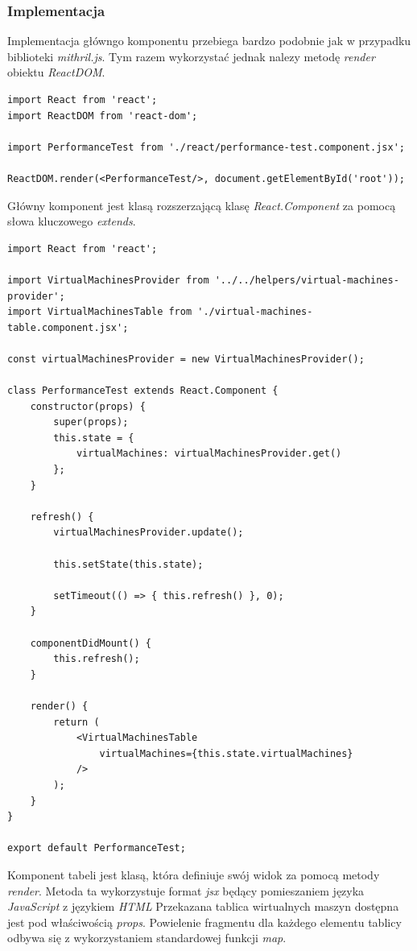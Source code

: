 \documentclass[polish, twoside, 12pt]{mwart}
\begin{document}
\subsubsection{Implementacja}

Implementacja główngo komponentu przebiega bardzo podobnie jak w przypadku biblioteki \emph{mithril.js}. Tym razem wykorzystać jednak nalezy metodę \emph{render} obiektu \emph{ReactDOM}.

\begin{lstlisting}[caption=Inicjalizacja głównego komponentu]
import React from 'react';
import ReactDOM from 'react-dom';

import PerformanceTest from './react/performance-test.component.jsx';

ReactDOM.render(<PerformanceTest/>, document.getElementById('root'));
\end{lstlisting}

Główny komponent jest klasą rozszerzającą klasę \emph{React.Component} za pomocą słowa kluczowego \emph{extends}.

\begin{lstlisting}[caption=Główny komponent]
import React from 'react';

import VirtualMachinesProvider from '../../helpers/virtual-machines-provider';
import VirtualMachinesTable from './virtual-machines-table.component.jsx';

const virtualMachinesProvider = new VirtualMachinesProvider();

class PerformanceTest extends React.Component {
    constructor(props) {
        super(props);
        this.state = {
            virtualMachines: virtualMachinesProvider.get()
        };
    }

    refresh() {
        virtualMachinesProvider.update();

        this.setState(this.state);

        setTimeout(() => { this.refresh() }, 0);
    }

    componentDidMount() {
        this.refresh();
    }

    render() {
        return (
            <VirtualMachinesTable
                virtualMachines={this.state.virtualMachines}
            />
        );
    }
}

export default PerformanceTest;
\end{lstlisting}

Komponent tabeli jest klasą, która definiuje swój widok za pomocą metody \emph{render}. Metoda ta wykorzystuje format \emph{jsx} będący pomieszaniem języka \emph{JavaScript} z językiem \emph{HTML}
Przekazana tablica wirtualnych maszyn dostępna jest pod właściwością \emph{props}. Powielenie fragmentu dla każdego elementu tablicy odbywa się z wykorzystaniem standardowej funkcji \emph{map}.
\end{document}
